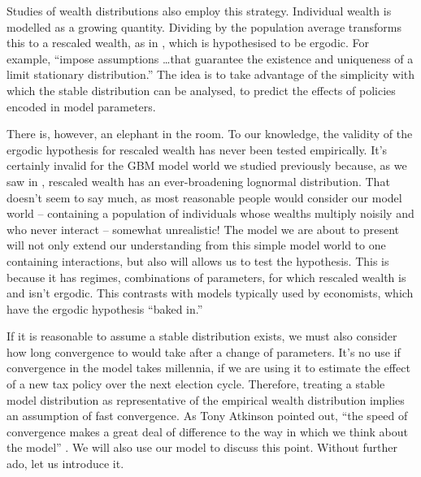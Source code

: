 Studies of wealth distributions also employ this strategy. Individual wealth is modelled as a growing quantity. Dividing by the population average transforms this to a rescaled wealth, as in , which is hypothesised to be ergodic. For example, \cite[p.~130]{BenhabibBisinZhu2011} ``impose assumptions \dots that guarantee the existence and uniqueness of a limit stationary distribution.'' The idea is to take advantage of the simplicity with which the stable distribution can be analysed, \eg to predict the effects of policies encoded in model parameters.

There is, however, an elephant in the room. To our knowledge, the validity of the ergodic hypothesis for rescaled wealth has never been tested empirically. It's certainly invalid for the GBM model world we studied previously because, as we saw in , rescaled wealth has an ever-broadening lognormal distribution. That doesn't seem to say much, as most reasonable people would consider our model world -- containing a population of individuals whose wealths multiply noisily and who never interact -- somewhat unrealistic! The model we are about to present will not only extend our understanding from this simple model world to one containing interactions, but also will allows us to test the hypothesis. This is because it has regimes, \ie combinations of parameters, for which rescaled wealth is and isn't ergodic. This contrasts with models typically used by economists, which have the ergodic hypothesis ``baked in.''

If it is reasonable to assume a stable distribution exists, we must also consider how long convergence to would take after a change of parameters. It's no use if convergence in the model takes millennia, if we are using it to estimate the effect of a new tax policy over the next election cycle. Therefore, treating a stable model distribution as representative of the empirical wealth distribution implies an assumption of fast convergence.  As Tony Atkinson pointed out, ``the speed of convergence makes a great deal of difference to the way in which we think about the model'' \cite{atkinson1969timescale}. We will also use our model to discuss this point. Without further ado, let us introduce it.


